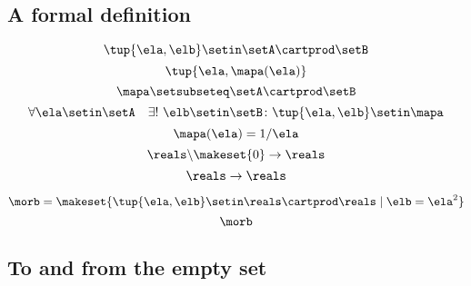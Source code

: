 \begin{forslides}
    \subsection{A formal definition}

    \begin{equation}
        \label{eq:slides_session2_107}
        \tup{\ela, \elb} \setin\setA \cartprod \setB
    \end{equation}
    \begin{equation}
        \label{eq:slides_session2_108}
        \tup{\ela, \mapa(\ela)}
    \end{equation}
    \begin{equation}
        \label{eq:slides_session2_109}
        \mapa \setsubseteq \setA \cartprod \setB
    \end{equation}
    \begin{equation}
        \label{eq:slides_session2_110}
        \forall \ela \setin\setA  \quad  \exists !
        \ \elb \setin\setB \colon \tup{\ela,\elb} \setin\mapa
    \end{equation}
    \begin{equation}
        \label{eq:slides_session2_111}
        \mapa(\ela) = 1/ \ela
    \end{equation}
    \begin{equation}
        \label{eq:slides_session2_112}
        \reals \backslash \makeset{ 0 } \to \reals
    \end{equation}
    \begin{equation}
        \label{eq:slides_session2_113}
        \reals \to \reals
    \end{equation}

    \begin{equation}
        \label{eq:slides_session2_113a}
        \morb = \makeset{\tup{\ela, \elb} \setin \reals \cartprod \reals \mid \elb = \ela^2}
    \end{equation}
    \begin{equation}
        \label{eq:slides_session2_113b}
        \morb
    \end{equation}

    \subsection{To and from the empty set}


\end{forslides}
